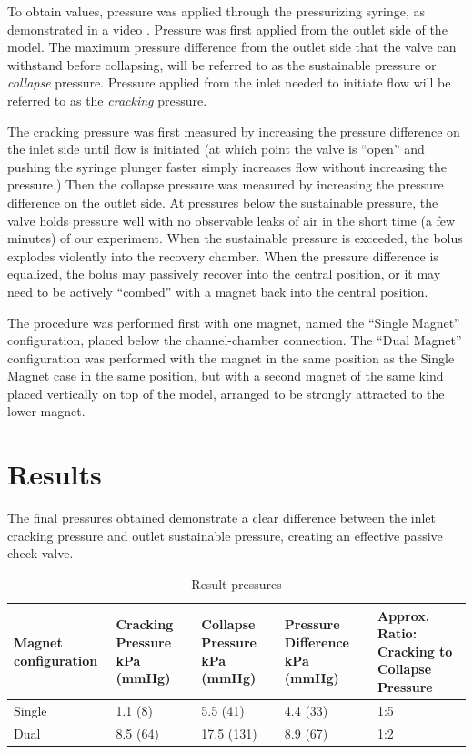 \documentclass{asme2ej}
\begin{document}
To obtain values, pressure was applied through the pressurizing
syringe, as demonstrated in a video \cite{stuckey2021video}.
Pressure was first applied from the outlet side of the model.
The maximum pressure difference from the outlet side that the
valve can withstand before collapsing, will be referred to as the
sustainable pressure or {\em collapse} pressure.
Pressure applied from the inlet needed to
initiate flow will be referred to as the {\em cracking} pressure.

The cracking pressure was first measured by increasing the pressure
difference on the inlet side until flow is initiated (at which point
the valve is ``open'' and
pushing the syringe plunger faster simply increases flow without
increasing the pressure.) Then the
collapse pressure was measured by increasing the pressure
difference on the outlet side. At pressures below the sustainable
pressure, the valve holds pressure well with no observable leaks of
air in the short time (a few minutes) of our experiment. When the
sustainable pressure is exceeded, the bolus explodes violently into
the recovery chamber. When the pressure difference is equalized, the
bolus may passively recover into the central position, or it may need
to be actively “combed” with a magnet back into the central position.

The procedure was performed first with one magnet, named the “Single
Magnet” configuration, placed below the channel-chamber connection.
The “Dual Magnet” configuration was performed with the magnet in the
same position as the Single Magnet case in the same position, but with
a second magnet of the same kind placed vertically on top of the model,
arranged to be strongly attracted to the lower magnet.

\section{Results}
The final pressures obtained demonstrate a clear difference between
the inlet cracking pressure and outlet sustainable pressure, creating
an effective passive check valve.

\begin{table}[t]
\footnotesize
\caption{Result pressures}
\begin{center}
\label{table_ASME}
\begin{tabular}{|p{0.3in} |p{0.4in} |p{0.49in} |p{0.45in} |p{0.6in} |}
\hline
Magnet configuration &
Cracking Pressure kPa  (mmHg) &
Collapse Pressure kPa  (mmHg) &
Pressure Difference kPa  (mmHg) &
Approx. Ratio: Cracking to Collapse Pressure \\
\hline
Single &
1.1 (8) &
5.5 (41) &
4.4 (33) &
1:5 \\
\hline
Dual &
8.5 (64) &
17.5 (131)&
8.9 (67)&
1:2 \\
\hline
\end{tabular}
\end{center}
\end{table}
\end{document}

